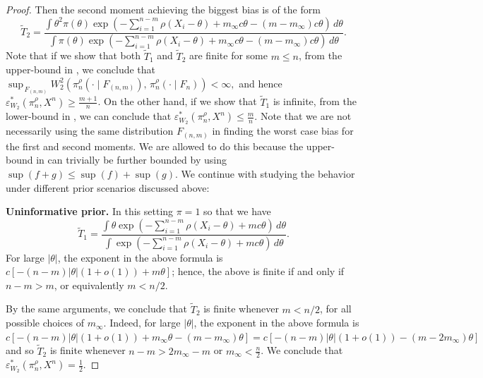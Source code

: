 \documentclass[11pt, oneside]{amsart}
\theoremstyle{definition}   %
\newcommand{\loss}{\rho}
\newcommand{\mposterior}{\pi_n^{\loss}}
\begin{document}
\begin{proof}
    Then the second moment achieving the biggest bias is of the form
    \begin{equation}
        \widetilde T_2 = \frac{\int \theta^2 \pi(\theta) \exp \left (-\sum_{i=1}^{n-m} \rho(X_i - \theta) + m_{\infty} c\theta - (m - m_{\infty})c \theta \right) \, d\theta}{\int \pi(\theta) \exp \left (-\sum_{i=1}^{n-m} \rho(X_i - \theta) + m_{\infty} c\theta - (m - m_{\infty})c \theta\right) \, d\theta}.
    \end{equation}
    Note that if we show that both \( \widetilde T_1\) and \(\widetilde T_2\) are finite for some \( m \leq n\), from the upper-bound in , we conclude that \( \sup_{\, F_{(n,m)}} W_2^2 (\mposterior(\cdot \mid F_{(n,m)}), \, \mposterior (\cdot \mid F_n ) ) < \infty, \) and hence \(\varepsilon^*_{W_2}(\pi^{\rho}_n, X^n) \geq \frac{m+1}{n}\). 
    On the other hand, if we show that \( \widetilde T_1\) is infinite, from the lower-bound in , we can conclude that \(\varepsilon^*_{W_2}(\pi^{\rho}_n, X^n) \leq \frac{m}{n}.\) 
    Note that we are not necessarily using the same distribution $F_{(n,m)}$ in finding the worst case bias for the first and second moments. We are allowed to do this because the upper-bound in  can trivially be further bounded by using \( \sup(f+g) \leq \sup(f) + \sup(g).\) We continue with studying the behavior under different prior scenarios discussed above:
    
    \textbf{Uninformative prior.} In this setting $\pi=1$ so that we have 
    \[
        \widetilde T_1 = \frac{\int \theta \exp \left (-\sum_{i=1}^{n-m} \rho(X_i - \theta) + mc\theta \right) \, d\theta}{\int  \exp \left (-\sum_{i=1}^{n-m} \rho(X_i - \theta) + mc\theta\right) \, d\theta}.
    \]
    For large \( |\theta|\), the exponent in the above formula is \( c[ - (n-m)|\theta| (1 + o(1)) + m\theta] \); hence, the above is finite if and only if \( n - m > m\), or equivalently \( m < n / 2\). 
    

By the same arguments, we conclude that \( \widetilde T_2 \) is finite whenever \( m < n / 2\), for all possible choices of \( m_\infty\). Indeed,  for large \( |\theta|\), the exponent in the above formula is \( c[ - (n-m)|\theta| (1 + o(1)) + m_{\infty}\theta - (m- m_{\infty})\theta] = c[ - (n-m)|\theta| (1 + o(1)) - (m- 2m_{\infty})\theta] \) and so \( \widetilde T_2 \) is finite whenever $n - m > 2 m_{\infty} - m$ or $m_{\infty} < \frac{n}{2}$.
We conclude that
    \( \varepsilon^*_{W_2}(\pi^{\rho}_n, X^n) = \frac{1}{2}.\)


\end{proof}
\end{document}

